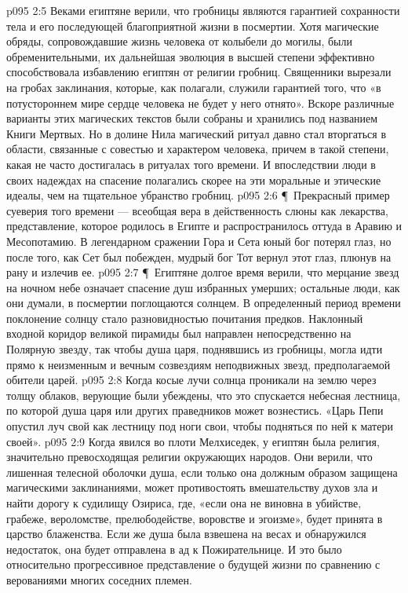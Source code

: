 \vs p095 2:5 Веками египтяне верили, что гробницы являются гарантией сохранности тела и его последующей благоприятной жизни в посмертии. Хотя магические обряды, сопровождавшие жизнь человека от колыбели до могилы, были обременительными, их дальнейшая эволюция в высшей степени эффективно способствовала избавлению египтян от религии гробниц. Священники вырезали на гробах заклинания, которые, как полагали, служили гарантией того, что «в потустороннем мире сердце человека не будет у него отнято». Вскоре различные варианты этих магических текстов были собраны и хранились под названием Книги Мертвых. Но в долине Нила магический ритуал давно стал вторгаться в области, связанные с совестью и характером человека, причем в такой степени, какая не часто достигалась в ритуалах того времени. И впоследствии люди в своих надеждах на спасение полагались скорее на эти моральные и этические идеалы, чем на тщательное убранство гробниц.
\vs p095 2:6 \P\ Прекрасный пример суеверия того времени --- всеобщая вера в действенность слюны как лекарства, представление, которое родилось в Египте и распространилось оттуда в Аравию и Месопотамию. В легендарном сражении Гора и Сета юный бог потерял глаз, но после того, как Сет был побежден, мудрый бог Тот вернул этот глаз, плюнув на рану и излечив ее.
\vs p095 2:7 \P\ Египтяне долгое время верили, что мерцание звезд на ночном небе означает спасение душ избранных умерших; остальные люди, как они думали, в посмертии поглощаются солнцем. В определенный период времени поклонение солнцу стало разновидностью почитания предков. Наклонный входной коридор великой пирамиды был направлен непосредственно на Полярную звезду, так чтобы душа царя, поднявшись из гробницы, могла идти прямо к неизменным и вечным созвездиям неподвижных звезд, предполагаемой обители царей.
\vs p095 2:8 Когда косые лучи солнца проникали на землю через толщу облаков, верующие были убеждены, что это спускается небесная лестница, по которой душа царя или других праведников может вознестись. «Царь Пепи опустил луч свой как лестницу под ноги свои, чтобы подняться по ней к матери своей».
\vs p095 2:9 Когда явился во плоти Мелхиседек, у египтян была религия, значительно превосходящая религии окружающих народов. Они верили, что лишенная телесной оболочки душа, если только она должным образом защищена магическими заклинаниями, может противостоять вмешательству духов зла и найти дорогу к судилищу Озириса, где, «если она не виновна в убийстве, грабеже, вероломстве, прелюбодействе, воровстве и эгоизме», будет принята в царство блаженства. Если же душа была взвешена на весах и обнаружился недостаток, она будет отправлена в ад к Пожирательнице. И это было относительно прогрессивное представление о будущей жизни по сравнению с верованиями многих соседних племен.
